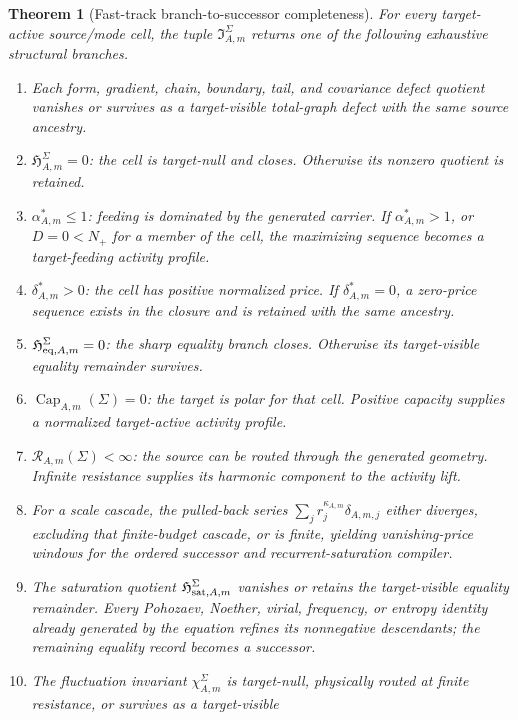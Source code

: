 \documentclass[11pt]{article}
\numberwithin{section}{part}
\theoremstyle{plain}
\newtheorem{theorem}{Theorem}[section]
\theoremstyle{definition}
\theoremstyle{remark}
\begin{document}
\begin{theorem}[Fast-track branch-to-successor completeness]
\label{thm:fast-track-branch-completeness}
For every target-active source/mode cell, the tuple
\(\mathfrak I_{A,m}^{\Sigma}\) returns one of the following exhaustive
structural branches.
\begin{enumerate}[label=\textup{(F\arabic*)}]
\item Each form, gradient, chain, boundary, tail, and covariance defect
quotient vanishes or survives as a target-visible total-graph defect with the
same source ancestry.
\item \(\mathfrak H_{A,m}^{\Sigma}=0\): the cell is target-null and closes.
Otherwise its nonzero quotient is retained.
\item \(\alpha_{A,m}^*\le1\): feeding is dominated by the generated carrier.
If \(\alpha_{A,m}^*>1\), or \(D=0<N_+\) for a member of the cell, the
maximizing sequence becomes a target-feeding activity profile.
\item \(\delta_{A,m}^*>0\): the cell has positive normalized price.
If \(\delta_{A,m}^*=0\), a zero-price sequence exists in the closure and is
retained with the same ancestry.
\item \(\mathfrak H_{{\rm eq},A,m}^{\Sigma}=0\): the sharp equality branch
closes.  Otherwise its target-visible equality remainder survives.
\item \(\operatorname{Cap}_{A,m}(\Sigma)=0\): the target is polar for that
cell.  Positive capacity supplies a normalized target-active activity profile.
\item \(\mathcal R_{A,m}(\Sigma)<\infty\): the source can be routed through
the generated geometry.  Infinite resistance supplies its harmonic component
to the activity lift.
\item For a scale cascade, the pulled-back series
\(\sum_j r_j^{\kappa_{A,m}}\delta_{A,m,j}\) either diverges, excluding that
finite-budget cascade, or is finite, yielding vanishing-price windows for the
ordered successor and recurrent-saturation compiler.
\item The saturation quotient \(\mathfrak H_{{\rm sat},A,m}^{\Sigma}\)
vanishes or retains the target-visible equality remainder.  Every Pohozaev,
Noether, virial, frequency, or entropy identity already generated by the
equation refines its nonnegative descendants; the remaining equality record becomes
a successor.
\item The fluctuation invariant \(\chi_{A,m}^{\Sigma}\) is target-null,
physically routed at finite resistance, or survives as a target-visible

\end{enumerate}
\end{theorem}
\end{document}
